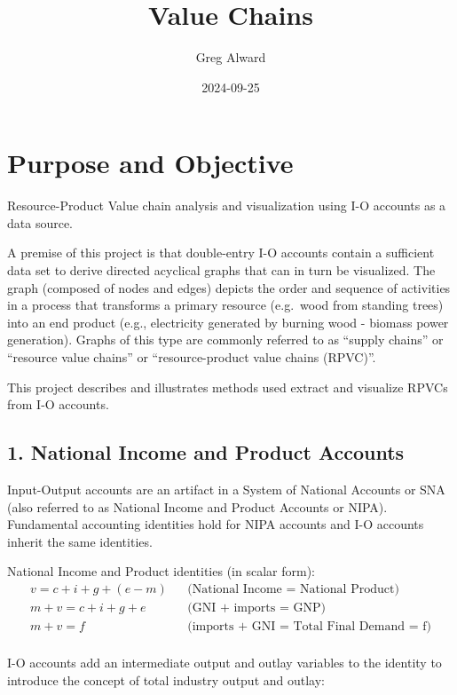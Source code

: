 \documentclass[
  letterpaper,
  DIV=11,
  numbers=noendperiod]{scrreprt}
\title{Value Chains}
\author{Greg Alward}
\date{2024-09-25}
\begin{document}
\maketitle


\chapter{Purpose and Objective}\label{purpose-and-objective}

Resource-Product Value chain analysis and visualization using I-O
accounts as a data source.

A premise of this project is that double-entry I-O accounts contain a
sufficient data set to derive directed acyclical graphs that can in turn
be visualized. The graph (composed of nodes and edges) depicts the order
and sequence of activities in a process that transforms a primary
resource (e.g.~wood from standing trees) into an end product (e.g.,
electricity generated by burning wood - biomass power generation).
Graphs of this type are commonly referred to as ``supply chains'' or
``resource value chains'' or ``resource-product value chains (RPVC)''.

This project describes and illustrates methods used extract and
visualize RPVCs from I-O accounts.

\section{1. National Income and Product
Accounts}\label{national-income-and-product-accounts}

Input-Output accounts are an artifact in a System of National Accounts
or SNA (also referred to as National Income and Product Accounts or
NIPA). Fundamental accounting identities hold for NIPA accounts and I-O
accounts inherit the same identities.

National Income and Product identities (in scalar form): \[
\begin{align}
  v = c+i+g+(e-m)   && \text{(National Income = National Product)}\\
  m+v = c+i+g+e     && \text{(GNI + imports = GNP)}\\
  m+v = f     && \text{(imports + GNI = Total Final Demand = f)}\\
\end{align}
\]

I-O accounts add an intermediate output and outlay variables to the
identity to introduce the concept of total industry output and outlay:
\end{document}
